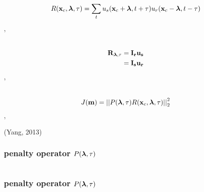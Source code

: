 \begin{frame}
  \[
     R({\bf x}_c,{\boldsymbol{\lambda}},\tau) =
     \sum_{t} u_s({\bf x}_c+{\boldsymbol{\lambda}},t+\tau) u_r({\bf x}_c-{\boldsymbol{\lambda}},t-\tau)
  \]
\sep  
  \\
  \\
\end{frame}


\begin{frame}
  \begin{align}
    {\bf R}_{{\boldsymbol{\lambda}},\tau} &= {\bf I_r} {\bf u_s}  \nonumber \\
                       &=  {\bf I_s} {\bf u_r} \nonumber
  \end{align}
\sep  
  \\
  \\
  {} 
\end{frame}
\begin{frame}
\end{frame}



\begin{frame}
  \[
  J({\bf m}) = \left|\left|P({\boldsymbol{\lambda}},\tau) R({\bf x}_c,{\boldsymbol{\lambda}},\tau)\right|\right|^{2}_{2}
  \]
\sep
  \\
  \begin{flushright}
  (Yang, 2013)
  \end{flushright}
\end{frame}




\begin{frame} \frametitle{penalty operator $ P({\boldsymbol{\lambda}},\tau)$}
  \begin{columns}
  \end{columns}
\end{frame}

\begin{frame} \frametitle{penalty operator $ P({\boldsymbol{\lambda}},\tau)$}
  \begin{columns}
  \end{columns}
\end{frame}

